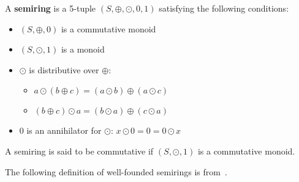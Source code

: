 \begin{definition} 
    \label{def_semiring}
        A \textbf{semiring} is a 5-tuple $(S,\oplus,\odot,0,1)$ satisfying the following conditions:
         \begin{itemize}
            \item {$(S,\oplus,0)$ is a commutative monoid} 
            \item {$(S,\odot,1)$ is a monoid} 
            \item {$\odot$ is distributive over $\oplus$:}
            \begin{itemize}
                \item $a \odot ( b \oplus c) = (a \odot b) \oplus (a \odot c)$ 
                \item $(b \oplus c) \odot a = (b \odot a) \oplus (c \odot a)$
            \end{itemize} 
            \item {0 is an annihilator for $\odot$:} $x \odot 0= 0 =  0 \odot x $
        \end{itemize}
        A semiring is said to be commutative if $(S,\odot,1)$ is a commutative monoid.
\end{definition}
The following definition of well-founded semirings is from~\cite{endrullis2024generalized_icgt}.
